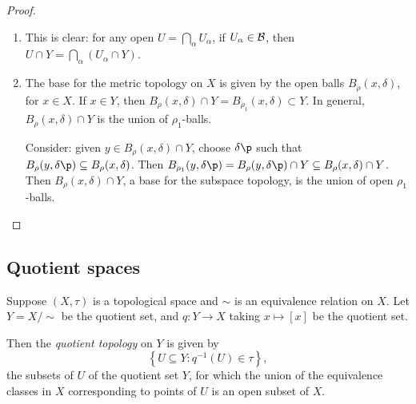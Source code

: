 \begin{proof}
\mbox{}
\begin{enumerate}
	\item This is clear: for any open $U=\bigcap_\alpha U_\alpha$, if $U_\alpha\in\cal{B}$, then $U\cap Y = \bigcap_\alpha (U_\alpha \cap Y)$.
	\item The base for the metric topology on $X$ is given by the open balls $B_\rho(x,\delta)$, for $x\in X$. If $x\in Y$, then $B_\rho(x,\delta) \cap Y = B_{\rho_1}(x,\delta) \subset Y$. In general, $B_\rho(x,\delta) \cap Y$ is the union of $\rho_1$-balls.

	Consider: given $y\in B_\rho(x,\delta) \cap Y$, choose $\delta\p$ such that $B_\rho(y,\delta\p) \subseteq B_\rho(x,\delta)$. Then $B_{\rho_1}(y,\delta\p) = B_\rho(y,\delta\p) \cap Y \subseteq B_\rho(x,\delta) \cap Y$. Then $B_\rho(x,\delta) \cap Y$, a base for the subspace topology, is the union of open $\rho_1$-balls.
	\qedhere
\end{enumerate}
\end{proof}



	\pagebreak

\subsection{Quotient spaces} %
\label{sub:quotient_spaces}

\begin{definition}
	Suppose $(X,\tau)$ is a topological space and $\sim$ is an equivalence relation on $X$. Let $Y=X/\sim$ be the quotient set, and $q:Y\to X$ taking $x\mapsto[x]$ be the quotient set.

	Then the \emph{quotient topology} on $Y$ is given by
	\begin{equation*}
		\left\{U \subseteq Y: q^{-1}(U) \in \tau\right\},
	\end{equation*}
	the subsets of $U$ of the quotient set $Y$, for which the union of the equivalence classes in $X$ corresponding to points of $U$ is an open subset of $X$.
\end{definition}

\vspace{3pt}

